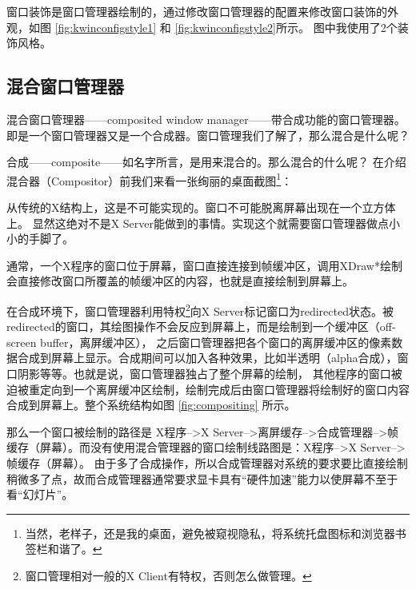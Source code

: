 
窗口装饰是窗口管理器绘制的，通过修改窗口管理器的配置来修改窗口装饰的外观，如图 \ref{fig:kwinconfigstyle1} 和 \ref{fig:kwinconfigstyle2}所示。
图中我使用了2个装饰风格。



\subsection{混合窗口管理器}

混合窗口管理器——composited window manager——带合成功能的窗口管理器。
即是一个窗口管理器又是一个合成器。窗口管理我们了解了，那么混合是什么呢？

合成——composite——如名字所言，是用来混合的。那么混合的什么呢？
在介绍混合器（Compositor）前我们来看一张绚丽的桌面截图\footnote{当然，老样子，还是我的桌面，避免被窥视隐私，将系统托盘图标和浏览器书签栏和谐了。}：


从传统的X结构上，这是不可能实现的。窗口不可能脱离屏幕出现在一个立方体上。
显然这绝对不是X Server能做到的事情。实现这个就需要窗口管理器做点小小的手脚了。

通常，一个X程序的窗口位于屏幕，窗口直接连接到帧缓冲区，调用XDraw*绘制会直接修改窗口所覆盖的帧缓冲区的内容，也就是直接绘制到屏幕上。


在合成环境下，窗口管理器利用特权\footnote{窗口管理相对一般的X Client有特权，否则怎么做管理。}向X Server标记窗口为redirected状态。被redirected的窗口，其绘图操作不会反应到屏幕上，而是绘制到一个缓冲区（off-screen buffer，离屏缓冲区）， 之后窗口管理器把各个窗口的离屏缓冲区的像素数据合成到屏幕上显示。合成期间可以加入各种效果，比如半透明（alpha合成），窗口阴影等等。也就是说，窗口管理器独占了整个屏幕的绘制，
其他程序的窗口被迫被重定向到一个离屏缓冲区绘制，绘制完成后由窗口管理器将绘制好的窗口内容合成到屏幕上。整个系统结构如图 \ref{fig:compositing} 所示。


那么一个窗口被绘制的路径是 X程序-->X Server-->离屏缓存-->合成管理器-->帧缓存（屏幕）。而没有使用混合管理器的窗口绘制线路图是：X程序-->X Server-->帧缓存（屏幕）。
由于多了合成操作，所以合成管理器对系统的要求要比直接绘制稍微多了点，故而合成管理器通常要求显卡具有“硬件加速”能力以使屏幕不至于看“幻灯片”。

